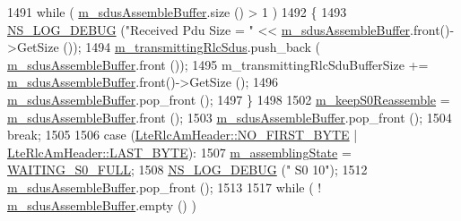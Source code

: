 \begin{DoxyCode}
1491                               \textcolor{keywordflow}{while} ( \hyperlink{classns3_1_1LteRlcAm_a075262ee7d8d49e97ab0c48b5e763bf1}{m\_sdusAssembleBuffer}.size () > 1 )
1492                                 \{
1493                                   \hyperlink{group__logging_ga413f1886406d49f59a6a0a89b77b4d0a}{NS\_LOG\_DEBUG} (\textcolor{stringliteral}{"Received Pdu Size = "} << 
      \hyperlink{classns3_1_1LteRlcAm_a075262ee7d8d49e97ab0c48b5e763bf1}{m\_sdusAssembleBuffer}.front()->GetSize ());
1494                                   \hyperlink{classns3_1_1LteRlcAm_a941fac42e27a28f35b0eea1a02c0595f}{m\_transmittingRlcSdus}.push\_back (
      \hyperlink{classns3_1_1LteRlcAm_a075262ee7d8d49e97ab0c48b5e763bf1}{m\_sdusAssembleBuffer}.front ());
1495                                   m\_transmittingRlcSduBufferSize += 
      \hyperlink{classns3_1_1LteRlcAm_a075262ee7d8d49e97ab0c48b5e763bf1}{m\_sdusAssembleBuffer}.front()->GetSize ();
1496                                   \hyperlink{classns3_1_1LteRlcAm_a075262ee7d8d49e97ab0c48b5e763bf1}{m\_sdusAssembleBuffer}.pop\_front ();
1497                                 \}
1498 
1502                               \hyperlink{classns3_1_1LteRlcAm_ab3240ea3468d9b515fc38e717273d3bd}{m\_keepS0Reassemble} = 
      \hyperlink{classns3_1_1LteRlcAm_a075262ee7d8d49e97ab0c48b5e763bf1}{m\_sdusAssembleBuffer}.front ();
1503                               \hyperlink{classns3_1_1LteRlcAm_a075262ee7d8d49e97ab0c48b5e763bf1}{m\_sdusAssembleBuffer}.pop\_front ();
1504                       \textcolor{keywordflow}{break};
1505 
1506                       \textcolor{keywordflow}{case} (\hyperlink{classns3_1_1LteRlcAmHeader_af42d22f1202bd0d8fa1f4cd0494b8b29a32b741f4f0b7c331632c185341ac9cb4}{LteRlcAmHeader::NO\_FIRST\_BYTE} | 
      \hyperlink{classns3_1_1LteRlcAmHeader_af0fb4ccf208128c7cf9dcabf02593749afae5968023949559fdf8d8ad9feb81cd}{LteRlcAmHeader::LAST\_BYTE}):
1507                               \hyperlink{classns3_1_1LteRlcAm_ab6d2954b419df60fc8f8df012fa2709c}{m\_assemblingState} = 
      \hyperlink{classns3_1_1LteRlcAm_a43eeebdccf778e2247c956481ed03d62a832e01ad620b816d8bc1fe1b3fea8708}{WAITING\_S0\_FULL};
1508                               \hyperlink{group__logging_ga413f1886406d49f59a6a0a89b77b4d0a}{NS\_LOG\_DEBUG} (\textcolor{stringliteral}{" S0 10"});
1512                               \hyperlink{classns3_1_1LteRlcAm_a075262ee7d8d49e97ab0c48b5e763bf1}{m\_sdusAssembleBuffer}.pop\_front ();
1513 
1517                               \textcolor{keywordflow}{while} ( ! \hyperlink{classns3_1_1LteRlcAm_a075262ee7d8d49e97ab0c48b5e763bf1}{m\_sdusAssembleBuffer}.empty () )

\end{DoxyCode}

